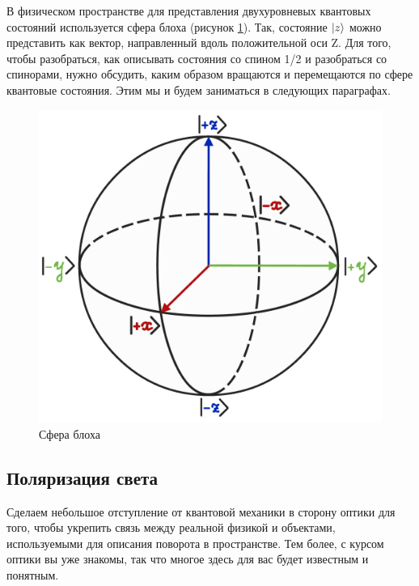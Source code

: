 В физическом пространстве для представления двухуровневых квантовых состояний используется сфера блоха (рисунок \ref{fig B.3}). Так, состояние $\ket{z}$ можно представить как вектор, направленный вдоль положительной оси Z. Для того, чтобы разобраться, как описывать состояния со спином 1/2 и разобраться со спинорами, нужно обсудить, каким образом вращаются и перемещаются по сфере квантовые состояния. Этим мы и будем заниматься в следующих параграфах.
\begin{figure}[!ht]
\centering
\includegraphics[scale=0.23]{appendix/images/bloch sphere.png}
\caption{Сфера блоха}
\label{fig B.3}
\end{figure}

\subsection{Поляризация света}
Сделаем небольшое отступление от квантовой механики в сторону оптики для того, чтобы укрепить связь между реальной физикой и объектами, используемыми для описания поворота в пространстве. Тем более, с курсом оптики вы уже знакомы, так что многое здесь для вас будет известным и понятным.
